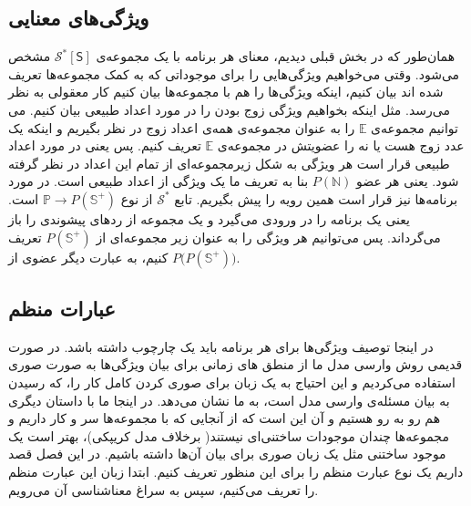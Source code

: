 \subsection{ویژگی‌های معنایی}
همان‌طور که در بخش قبلی دیدیم، معنای هر برنامه با یک مجموعه‌ی 
$\mathcal{S^*} [\mathsf{S}]$
مشخص می‌شود. وقتی می‌خواهیم ویژگی‌هایی را برای موجوداتی که به کمک مجموعه‌ها تعریف شده اند بیان کنیم، اینکه ویژگی‌ها را هم با مجموعه‌ها بیان کنیم کار معقولی به نظر می‌رسد. مثل اینکه بخواهیم ویژگی زوج بودن را در مورد اعداد طبیعی بیان کنیم. می توانیم مجموعه‌ی $\mathbb{E}$ را به عنوان مجموعه‌ی همه‌ی اعداد زوج در نظر بگیریم و اینکه یک عدد زوج هست یا نه را عضویتش در مجموعه‌ی $\mathbb{E}$ تعریف کنیم. پس یعنی در مورد اعداد طبیعی قرار است هر ویژگی به شکل زیرمجموعه‌ای از تمام این اعداد در نظر گرفته شود. یعنی هر عضو 
$\mathit{P}(\mathbb{N})$
بنا به تعریف ما یک ویژگی از اعداد طبیعی است.
در مورد برنامه‌ها نیز قرار است همین رویه را پیش بگیریم. تابع 
$\mathcal{S^*}$
از نوع 
$\mathbb{P} \rightarrow \mathit{P}(\mathbb{S^+})$
است. یعنی یک برنامه را در ورودی می‌گیرد و یک مجموعه از ردهای پیشوندی را باز می‌گرداند. پس می‌توانیم هر ویژگی را به عنوان زیر مجموعه‌ای از 
$\mathit{P}(\mathbb{S^+})$
تعریف کنیم، به عبارت دیگر عضوی از
$\mathit{P(P}(\mathbb{S^+}))$.

\subsection{عبارات منظم}
در اینجا توصیف ویژگی‌ها برای هر برنامه باید یک چارچوب داشته باشد. در صورت قدیمی روش وارسی مدل ما از منطق های زمانی برای بیان ویژگی‌ها به صورت صوری استفاده می‌کردیم و این احتیاج به یک زبان برای صوری کردن کامل کار را، که رسیدن به بیان مسئله‌ی وارسی مدل است، به ما نشان می‌دهد. در اینجا ما با داستان دیگری هم رو به رو هستیم و آن این است که از آنجایی که با مجموعه‌ها سر و کار داریم و مجموعه‌ها چندان موجودات ساختنی‌ای نیستند( برخلاف مدل کریپکی)، بهتر است یک موجود ساختنی مثل یک زبان صوری برای بیان آن‌ها داشته باشیم. در این فصل قصد داریم یک نوع عبارت منظم را برای این منظور تعریف کنیم. ابتدا زبان این عبارت منظم را تعریف می‌کنیم، سپس به سراغ معناشناسی آن می‌رویم. 
